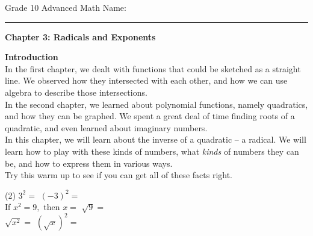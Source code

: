 \documentclass[12pt,fleqn]{book}
\begin{document}
\noindent
\thispagestyle{empty}
Grade 10 Advanced Math \hfill Name: \hspace{2in}
\medskip\hrule
\noindent

\vfill

\begin{center}
	{\bf \huge Chapter 3: Radicals and Exponents}
\end{center}

\vfill
\vfill

\clearpage

\setcounter{page}{1}

{\bf \huge Introduction }
\\[1in]
In the first chapter, we dealt with functions that could be sketched as a straight line.  We observed how they intersected with each other, and how we can use algebra to describe those intersections.
\\[1em]
In the second chapter, we learned about polynomial functions, namely quadratics, and how they can be graphed.  We spent a great deal of time finding roots of a quadratic, and even learned about imaginary numbers.
\\[1em]
In this chapter, we will learn about the inverse of a quadratic -- a radical.  We will learn how to play with these kinds of numbers, what \emph{kinds} of numbers they can be, and how to express them in various ways.
\\[1em]
Try this warm up to see if you can get all of these facts right.
\begin{tasks}(2)
    \task $3^2=$
    \task $(-3)^2=$
    \\[1in]
    \task If $x^2=9,$ then $x=$
    \task $\sqrt 9 =$
    \\[1in]
    \task $\sqrt{x^2}=$
    \task $(\sqrt x)^2=$
\end{tasks}
\clearpage
\end{document}
